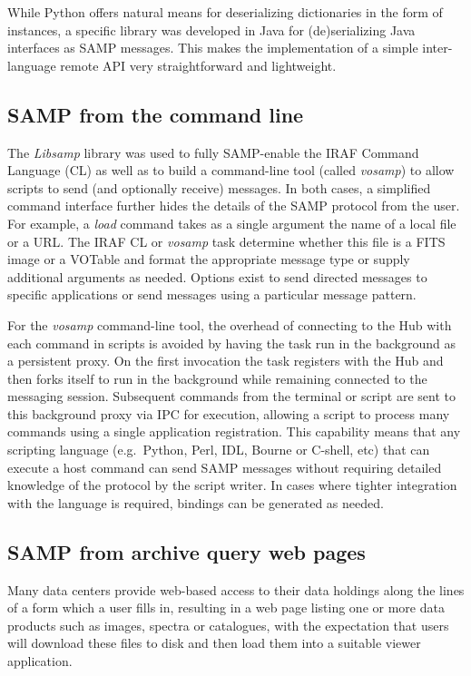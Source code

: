 \documentclass[11pt,twoside]{article}
\begin{document}
While Python offers natural means for deserializing dictionaries in the
form of instances, a specific library was developed in Java for
(de)serializing Java interfaces as SAMP messages. This makes the
implementation of a simple inter-language remote API very straightforward
and lightweight.

\subsection{SAMP from the command line}

The {\em Libsamp\/} library was used to fully SAMP-enable
the IRAF Command Language
(CL) as well as to build a command-line tool (called {\em vosamp\/}) to
allow scripts to send (and optionally receive) messages.  In both cases,
a simplified command interface further hides the details of the SAMP
protocol from the user.  For example, a {\em load\/} command takes as a single
argument the name of a local file or a URL. The IRAF CL or {\em vosamp\/}
task determine whether this file is a FITS image or a VOTable and format
the appropriate message type or supply additional arguments as needed.
Options exist to send directed messages to specific applications or send
messages using a particular message pattern.

For the {\em vosamp\/} command-line tool, the overhead of connecting to the
Hub with each command in scripts is avoided by having the task run in
the background as a persistent proxy.  On the first invocation the task
registers with the Hub and then forks itself to run in the background
while remaining connected to the messaging session.  Subsequent commands
from the terminal or script are sent to this background proxy via IPC
for execution, allowing a script to process many commands using a single
application registration.  This capability means that any scripting language
(e.g.\ Python, Perl, IDL, Bourne or C-shell, etc) that can execute a host
command can send SAMP messages without requiring detailed knowledge of the
protocol by the script writer.  In cases where tighter integration
with the language is required, bindings can be generated as needed.

\subsection{SAMP from archive query web pages}

Many data centers provide web-based access to their data holdings
along the lines of a form which a user fills in, resulting in a
web page listing one or more data products such as images, spectra
or catalogues, with the expectation that users will download these
files to disk and then load them into a suitable viewer application.
\end{document}
